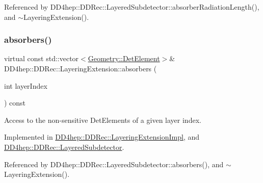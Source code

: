 Referenced by D\+D4hep\+::\+D\+D\+Rec\+::\+Layered\+Subdetector\+::absorber\+Radiation\+Length(), and $\sim$\+Layering\+Extension().

\hypertarget{class_d_d4hep_1_1_d_d_rec_1_1_layering_extension_a1204ac80c52fbca9ce3f71e2b3662eab}{}\label{class_d_d4hep_1_1_d_d_rec_1_1_layering_extension_a1204ac80c52fbca9ce3f71e2b3662eab} 
\subsubsection{\texorpdfstring{absorbers()}{absorbers()}}
{\footnotesize\ttfamily virtual const std\+::vector$<$\hyperlink{class_d_d4hep_1_1_geometry_1_1_det_element}{Geometry\+::\+Det\+Element}$>$\& D\+D4hep\+::\+D\+D\+Rec\+::\+Layering\+Extension\+::absorbers (\begin{DoxyParamCaption}\item[{int}]{layer\+Index }\end{DoxyParamCaption}) const\hspace{0.3cm}{\ttfamily [pure virtual]}}



Access to the non-\/sensitive Det\+Elements of a given layer index. 



Implemented in \hyperlink{class_d_d4hep_1_1_d_d_rec_1_1_layering_extension_impl_a693de8a0ae4873d4d1a7abc7a6e2afce}{D\+D4hep\+::\+D\+D\+Rec\+::\+Layering\+Extension\+Impl}, and \hyperlink{class_d_d4hep_1_1_d_d_rec_1_1_layered_subdetector_a4862f154cb8951a588a0091cb76bd17e}{D\+D4hep\+::\+D\+D\+Rec\+::\+Layered\+Subdetector}.



Referenced by D\+D4hep\+::\+D\+D\+Rec\+::\+Layered\+Subdetector\+::absorbers(), and $\sim$\+Layering\+Extension().

\hypertarget{class_d_d4hep_1_1_d_d_rec_1_1_layering_extension_ab4c19a0eccfd5cffc6816fa3b0ec9fb7}{}\label{class_d_d4hep_1_1_d_d_rec_1_1_layering_extension_ab4c19a0eccfd5cffc6816fa3b0ec9fb7} 
